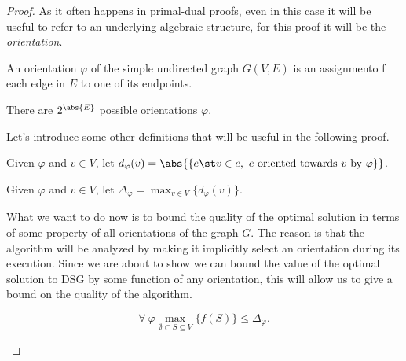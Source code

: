 \begin{proof}
    As it often happens in primal-dual proofs, even in this case it will be useful to refer to an underlying algebraic structure, for this proof it will be the \textit{orientation}.
    
    \begin{defn}[Orientation]
        An orientation $\varphi$ of the simple undirected graph $G(V,E)$ is an assignmento f each edge in $E$ to one of its endpoints.
    \end{defn}
    
    \obs There are $2^{\abs{E}}$ possible orientations $\varphi$.
    
    Let's introduce some other definitions that will be useful in the following proof.
    
    \begin{defn}
        Given $\varphi$ and $v \in V$, let $d_\varphi(v) = \abs{\{ e \st v \in e,\ e \text{ oriented towards } v \text{ by } \varphi \}}$.
    \end{defn}
    
    \begin{defn}
        Given $\varphi$ and $v \in V$, let $\Delta_\varphi = \max_{v \in V}\{d_\varphi(v)\}$.
    \end{defn}
    
    What we want to do now is to bound the quality of the optimal solution in terms of some property of all orientations of the graph $G$. The reason is that the algorithm will be analyzed by making it implicitly select an orientation during its execution. Since we are about to show we can bound the value of the optimal solution to DSG by some function of any orientation, this will allow us to give a bound on the quality of the algorithm.
    
    \begin{lem}\label{l:dsp-greedy-1}
        \begin{equation}
            \forall\ \varphi \max_{\emptyset \subset S \subseteq V}\{f(S)\} \leq \Delta_\varphi.
        \end{equation}
    \end{lem}
    

\end{proof}
